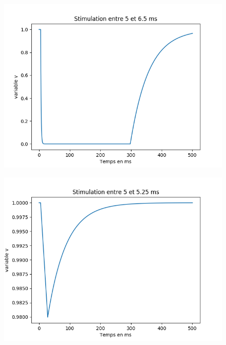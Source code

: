 \documentclass[a4paper,12pt,twoside]{report}
\begin{document}
\begin{figure}
	\centering
	\includegraphics[scale=0.5]{./v(t).png}
\end{figure}

\begin{figure}
	\centering
	\includegraphics[scale=0.5]{./v(t)_2.png}
\end{figure}
\end{document}
